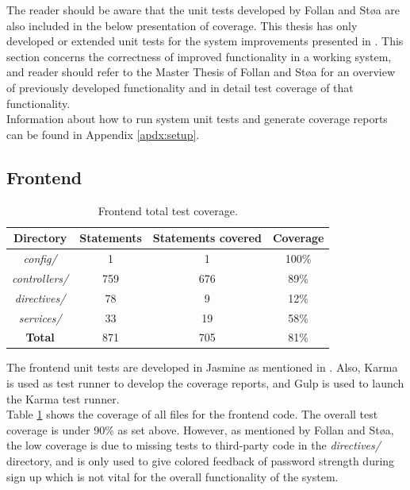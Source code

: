 The reader should be aware that the unit tests developed by Follan and Støa are also included in the below presentation of coverage. This thesis has only developed or extended unit tests for the system improvements presented in . This section concerns the correctness of improved functionality in a working system, and reader should refer to the Master Thesis of Follan and Støa for an overview of previously developed functionality and in detail test coverage of that functionality.  \\

Information about how to run system unit tests and generate coverage reports can be found in Appendix \ref{apdx:setup}.

\subsection{Frontend}
\begin{table}[h!]
    \centering
    \begin{tabular}{c c c c}
      \hline
      \textbf{Directory} & \textbf{Statements} & \textbf{Statements covered} & \textbf{Coverage} \\ \hline
      \textit{config/} & 1 & 1 & 100\% \\
      \textit{controllers/} & 759 & 676 & 89\% \\
      \textit{directives/} & 78 & 9 & 12\% \\
      \textit{services/} & 33 & 19 & 58\% \\ \hline
      \textbf{Total} & 871 & 705 & 81\% \\ \hline
    \end{tabular}
    \caption{Frontend total test coverage.}
    \label{tab:frontend-coverage-all}
\end{table}

The frontend unit tests are developed in Jasmine \cite{JASMINE} as mentioned in . Also, Karma \cite{KARMA} is used as test runner to develop the coverage reports, and Gulp \cite{GULP} is used to launch the Karma test runner.  \\

Table \ref{tab:frontend-coverage-all} shows the coverage of all files for the frontend code. The overall test coverage is under 90\% as set above. However, as mentioned by Follan and Støa, the low coverage is due to missing tests to third-party code in the \textit{directives/} directory, and is only used to give colored feedback of password strength during sign up which is not vital for the overall functionality of the system. \\

